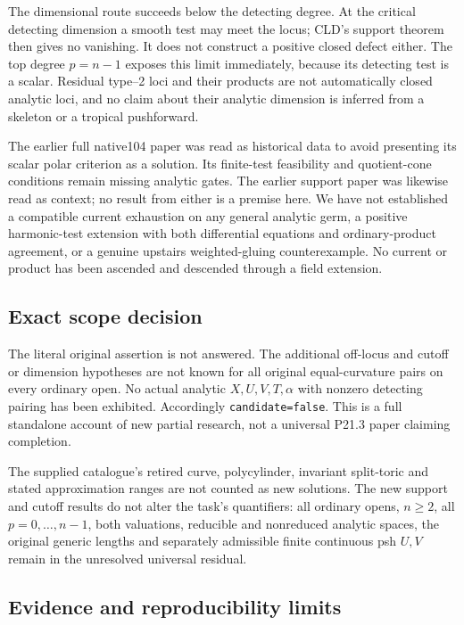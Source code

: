 \documentclass[11pt]{article}
\begin{document}
The dimensional route succeeds below the detecting degree. At the critical detecting dimension a smooth test may meet the locus; CLD's support theorem then gives no vanishing. It does not construct a positive closed defect either. The top degree \(p=n-1\) exposes this limit immediately, because its detecting test is a scalar. Residual type--2 loci and their products are not automatically closed analytic loci, and no claim about their analytic dimension is inferred from a skeleton or a tropical pushforward.

The earlier full native104 paper was read as historical data to avoid presenting its scalar polar criterion as a solution. Its finite-test feasibility and quotient-cone conditions remain missing analytic gates. The earlier support paper was likewise read as context; no result from either is a premise here. We have not established a compatible current exhaustion on any general analytic germ, a positive harmonic-test extension with both differential equations and ordinary-product agreement, or a genuine upstairs weighted-gluing counterexample. No current or product has been ascended and descended through a field extension.

\subsection{Exact scope decision}

The literal original assertion is not answered. The additional off-locus and cutoff or dimension hypotheses are not known for all original equal-curvature pairs on every ordinary open. No actual analytic \(X,U,V,T,\alpha\) with nonzero detecting pairing has been exhibited. Accordingly \texttt{candidate=false}. This is a full standalone account of new partial research, not a universal P21.3 paper claiming completion.

The supplied catalogue's retired curve, polycylinder, invariant split-toric and stated approximation ranges are not counted as new solutions. The new support and cutoff results do not alter the task's quantifiers: all ordinary opens, \(n\geq2\), all \(p=0,\ldots,n-1\), both valuations, reducible and nonreduced analytic spaces, the original generic lengths and separately admissible finite continuous psh \(U,V\) remain in the unresolved universal residual.

\subsection{Evidence and reproducibility limits}
\end{document}
